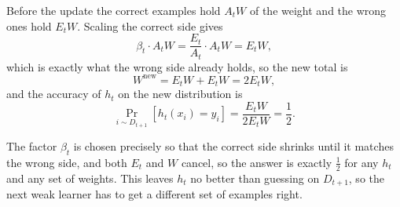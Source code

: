 \documentclass[11pt]{article}
\begin{document}
Before the update the correct examples hold \(A_tW\) of the weight and the
wrong ones hold \(E_tW\). Scaling the correct side gives
\[
\beta_t\cdot A_tW
=
\frac{E_t}{A_t}\cdot A_tW
=
E_tW,
\]
which is exactly what the wrong side already holds, so the new total is
\[
W^{\mathrm{new}}=E_tW+E_tW=2E_tW,
\]
and the accuracy of \(h_t\) on the new distribution is
\[
\boxed{
\Pr_{i\sim D_{t+1}}[h_t(x_i)=y_i]
=
\frac{E_tW}{2E_tW}
=
\frac12 .
}
\]

The factor \(\beta_t\) is chosen precisely so that the correct side shrinks
until it matches the wrong side, and both \(E_t\) and \(W\) cancel, so the
answer is exactly \(\frac12\) for any \(h_t\) and any set of weights. This
leaves \(h_t\) no better than guessing on \(D_{t+1}\), so the next weak
learner has to get a different set of examples right.
\end{document}
